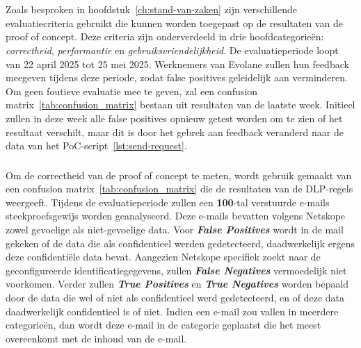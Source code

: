 
\chapter{}%
\label{ch:evaluatie}

\section{}
\label{sec:evaluatie-criteria}

Zoals besproken in hoofdstuk~\ref{ch:stand-van-zaken} zijn verschillende evaluatiecriteria gebruikt die kunnen worden toegepast op de resultaten van de proof of concept.
Deze criteria zijn onderverdeeld in drie hoofdcategorieën: \textit{correctheid}, \textit{performantie} en \textit{gebruiksvriendelijkheid}. 
De evaluatieperiode loopt van 22 april 2025 tot 25 mei 2025. 
Werknemers van Evolane zullen hun feedback meegeven tijdens deze periode, zodat false positives geleidelijk aan verminderen. 
Om geen foutieve evaluatie mee te geven, zal een confusion matrix~\ref{tab:confusion_matrix} bestaan uit resultaten van de laatste week. 
Initieel zullen in deze week alle false positives opnieuw getest worden om te zien of het resultaat verschilt, 
maar dit is door het gebrek aan feedback veranderd naar de data van het PoC-script~\ref{lst:send-request}.
        
\subsection{}
\label{sec:correctheid}

Om de correctheid van de proof of concept te meten, wordt gebruik gemaakt van een confusion matrix~\ref{tab:confusion_matrix} die de resultaten van de DLP-regels weergeeft.
Tijdens de evaluatieperiode zullen een \textbf{100}-tal verstuurde e-mails steekproefsgewijs worden geanalyseerd. Deze e-mails bevatten volgens Netskope zowel gevoelige als niet-gevoelige data.
Voor \textit{\textbf{False Positives}} wordt in de mail gekeken of de data die als confidentieel werden gedetecteerd, daadwerkelijk ergens deze confidentiële data bevat.
Aangezien Netskope specifiek zoekt naar de geconfigureerde identificatiegegevens, zullen \textit{\textbf{False Negatives}} vermoedelijk niet voorkomen.
Verder zullen \textit{\textbf{True Positives}} en \textit{\textbf{True Negatives}} worden bepaald door de data die wel of niet als confidentieel werd gedetecteerd, en of deze data daadwerkelijk confidentieel is of niet.
Indien een e-mail zou vallen in meerdere categorieën, dan wordt deze e-mail in de categorie geplaatst die het meest overeenkomt met de inhoud van de e-mail.


